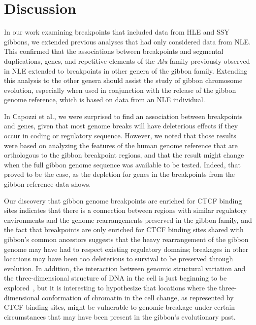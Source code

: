 \section{Discussion}

In our work examining breakpoints that included data from HLE and SSY gibbons, we extended previous analyses that had only considered data from NLE. This confirmed that the associations between breakpoints and segmental duplications, genes, and repetitive elements of the \emph{Alu} family previously observed in NLE extended to breakpoints in other genera of the gibbon family. Extending this analysis to the other genera should assist the study of gibbon chromosome evolution, especially when used in conjunction with the release of the gibbon genome reference, which is based on data from an NLE individual.

In Capozzi et al.\cite{Capozzi:2012bb}, we were surprised to find an association between breakpoints and genes, given that most genome breaks will have deleterious effects if they occur in coding or regulatory sequence. However, we noted that those results were based on analyzing the features of the human genome reference that are orthologous to the gibbon breakpoint regions, and that the result might change when the full gibbon genome sequence was available to be tested. Indeed, that proved to be the case, as the depletion for genes in the breakpoints from the gibbon reference data shows. 

Our discovery that gibbon genome breakpoints are enriched for CTCF binding sites indicates that there is a connection between regions with similar regulatory environments and the genome rearrangements preserved in the gibbon family, and the fact that breakpoints are only enriched for CTCF binding sites shared with gibbon's common ancestors suggests that the heavy rearrangement of the gibbon genome may have had to respect existing regulatory domains; breakages in other locations may have been too deleterious to survival to be preserved through evolution. In addition, the interaction between genomic structural variation and the three-dimensional structure of DNA in the cell is just beginning to be explored~\cite{Dixon:2012gc}, but it is interesting to hypothesize that locations where the three-dimensional conformation of chromatin in the cell change, as represented by CTCF binding sites, might be vulnerable to genomic breakage under certain circumstances that may have been present in the gibbon's evolutionary past.
